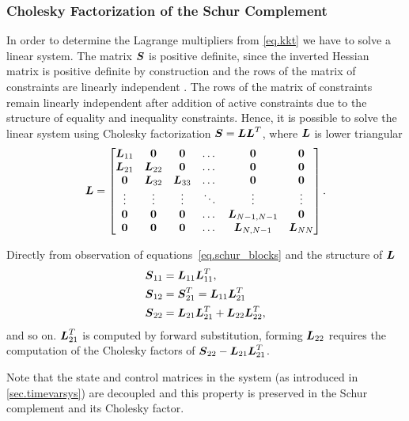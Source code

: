 \subsubsection{Cholesky Factorization of the Schur Complement}\label{sec.chol}
In order to determine the Lagrange multipliers from \cref{eq.kkt} we have to solve
a linear system. The matrix $\mbox{\boldmath $S$}$ is positive definite, since the inverted Hessian 
matrix is positive definite by construction and the rows of the matrix of constraints
are linearly independent \cite{golub1996matrix}. The rows of the matrix of constraints
remain linearly independent after addition of active constraints due to the structure
of equality and inequality constraints. Hence, it is possible to solve the linear
system using Cholesky factorization $\mbox{\boldmath $S$} = \mbox{\boldmath $L$}\mbox{\boldmath $L$}^T$, where $\mbox{\boldmath $L$}$ is
lower triangular 
%
$$
\mbox{\boldmath $L$} = 
  \begin{bmatrix} 
    \mbox{\boldmath $L$}_{11}  & \mbox{\boldmath $0$}  & \mbox{\boldmath $0$}     & \dots  & \mbox{\boldmath $0$} & \mbox{\boldmath $0$}        \\
    \mbox{\boldmath $L$}_{21}  & \mbox{\boldmath $L$}_{22}  & \mbox{\boldmath $0$} & \dots  & \mbox{\boldmath $0$} & \mbox{\boldmath $0$}        \\
    \mbox{\boldmath $0$}      & \mbox{\boldmath $L$}_{32}  & \mbox{\boldmath $L$}_{33} & \dots  & \mbox{\boldmath $0$} & \mbox{\boldmath $0$}        \\
    \vdots       & \vdots       & \vdots      & \ddots & \vdots  & \vdots         \\
    \mbox{\boldmath $0$}      & \mbox{\boldmath $0$}      & \mbox{\boldmath $0$}     & \dots  & \mbox{\boldmath $L$}_{N-1,N-1} & \mbox{\boldmath $0$} \\
    \mbox{\boldmath $0$}      & \mbox{\boldmath $0$}      & \mbox{\boldmath $0$}     & \dots  &  \mbox{\boldmath $L$}_{N,N-1} & \mbox{\boldmath $L$}_{NN} 
  \end{bmatrix}.
$$

Directly from observation of equations~\eqref{eq.schur_blocks} and the structure of $\mbox{\boldmath $L$}$
%
\begin{align*}
\mbox{\boldmath $S$}_{11} &= \mbox{\boldmath $L$}_{11}\mbox{\boldmath $L$}_{11}^T, \nonumber \\
\mbox{\boldmath $S$}_{12} &= \mbox{\boldmath $S$}_{21}^T = \mbox{\boldmath $L$}_{11}\mbox{\boldmath $L$}_{21}^T \\
\mbox{\boldmath $S$}_{22} &= \mbox{\boldmath $L$}_{21}\mbox{\boldmath $L$}_{21}^T + \mbox{\boldmath $L$}_{22}\mbox{\boldmath $L$}_{22}^T, 
\end{align*}
and so on. $\mbox{\boldmath $L$}_{21}^T$ is computed by forward substitution, forming $\mbox{\boldmath $L$}_{22}$ 
requires the computation of the Cholesky factors of $\mbox{\boldmath $S$}_{22} - \mbox{\boldmath $L$}_{21}\mbox{\boldmath $L$}_{21}^T$.

Note that the state and control matrices in the system (as introduced in 
\cref{sec.timevarsys}) are decoupled and this property is preserved in the
Schur complement and its Cholesky factor.



